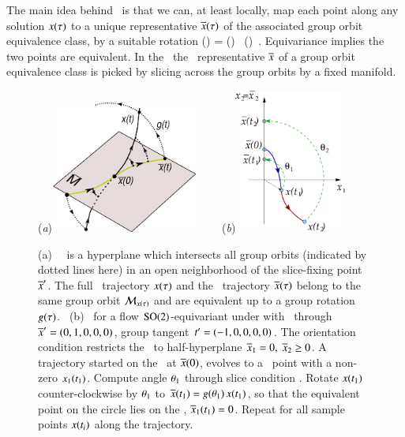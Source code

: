 \documentclass[preprint,number,sort&compress]{elsarticle}
\begin{document}
The main idea behind \mframes\ is that we can, at least locally,
map each point along any solution $x(\tau)$ to a unique
representative $\overline{x}(\tau)$ of the associated
group orbit equivalence class, by a suitable rotation
\beq
\ssp(\tau) = \LieEl(\tau) \, \sspRed(\tau)
\,.
Equivariance implies the two points are equivalent. In the
\mframes\ the \reducedsp\ representative $\overline{x}$ of a
group orbit equivalence class is picked by slicing across the
group orbits by a fixed manifold.
%
\begin{figure}[ht]
\begin{center}
(\textit{a})\includegraphics[width=0.43\textwidth,clip=true]{ReducTraj1}
~~~~(\textit{b})\includegraphics[width=0.33\textwidth,clip=true]{ESunrot}
\end{center}
\caption{
(a)
\Slice\ \pSRed\ is a hyperplane  which intersects
all
group orbits (indicated by dotted lines here) in an open
neighborhood of the slice-fixing point ${\overline{x}'}$. The full
\statesp\ trajectory $x(\tau)$ and the \reducedsp\
trajectory $\overline{x}(\tau)$ belong to the same group orbit
${\cal M}_{x(\tau)}$ and are equivalent up to a group rotation
$g(\tau)$.
~(b)
\Mframes\ for a flow $\textrm{SO}(2)$-equi\-vari\-ant under
 with \slice\ through ${\overline{x}'}=(0,1,0,0,0)$,
group tangent $t'_{}=(-1,0,0,0,0)$. The
orientation condition restricts the \slice\ to half-hyperplane
$\overline{x}_1=0,\;\overline{x}_2\ge 0$. A trajectory started on the
\slice\ at $\overline{x}(0)$, evolves to a \statesp\ point with a
non-zero $x_1(t_1)$. Compute angle ${\bf \theta}_1$
through slice condition . Rotate $x(t_1)$
counter-clockwise by ${\bf \theta}_1$ to $\overline{x}(t_1) =
g({\bf \theta}_1)\,x(t_1)$, so that the equivalent point
on the circle lies on the \slice, $\overline{x}_1(t_1) =0$. Repeat
for all sample points $x(t_i)$ along the trajectory.
}\label{fig:ReducTraj}
\end{figure}
%
\end{document}
